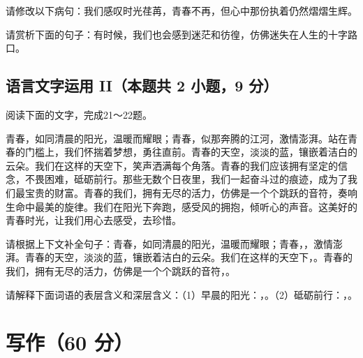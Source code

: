 \documentclass[zihao = -4]{exam-zh}
\begin{document}
       \begin{question}
         请修改以下病句：我们感叹时光荏苒，青春不再，但心中那份执着仍然熠熠生辉。

       \end{question}

       \begin{question}
         请赏析下面的句子：有时候，我们也会感到迷茫和彷徨，仿佛迷失在人生的十字路口。

       \end{question}


       \subsection{语言文字运用 II（本题共 2 小题，9 分）}


       阅读下面的文字，完成21～22题。

       \begin{material}
         青春，如同清晨的阳光，温暖而耀眼；青春，似那奔腾的江河，激情澎湃。站在青春的门槛上，我们怀揣着梦想，勇往直前。青春的天空，淡淡的蓝，镶嵌着洁白的云朵。我们在这样的天空下，笑声洒满每个角落。青春的我们应该拥有坚定的信念，不畏困难，砥砺前行。那些无数个日夜里，我们一起奋斗过的痕迹，成为了我们最宝贵的财富。青春的我们，拥有无尽的活力，仿佛是一个个跳跃的音符，奏响生命中最美的旋律。我们在阳光下奔跑，感受风的拥抱，倾听心的声音。这美好的青春时光，让我们用心去感受，去珍惜。\\
       \end{material}

       \begin{question}
         请根据上下文补全句子：青春，如同清晨的阳光，温暖而耀眼；青春，\fillin，激情澎湃。青春的天空，淡淡的蓝，镶嵌着洁白的云朵。我们在这样的天空下，\fillin。青春的我们，拥有无尽的活力，仿佛是一个个跳跃的音符，\fillin。

       \end{question}


       \begin{question}
         请解释下面词语的表层含义和深层含义：（1）早晨的阳光：，。（2）砥砺前行：，。

       \end{question}



       \section{写作（60 分）}
\end{document}
